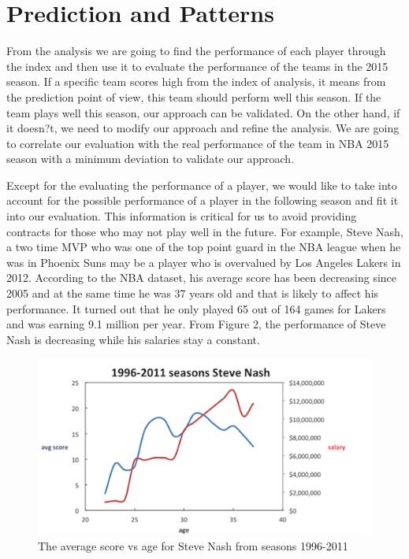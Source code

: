 \documentclass{acm_proc_article-sp}
\begin{document}
\section{Prediction and Patterns}
From the analysis we are going to find the performance of each player through the index and then use it to evaluate the performance of the teams in the 2015 season. If a specific team scores high from the index of analysis, it means from the prediction point of view, this team should perform well this season. If the team plays well this season, our approach can be validated. On the other hand, if it doesn?t, we need to modify our approach and refine the analysis. We are going to correlate our evaluation with the real performance of the team in NBA 2015 season with a minimum deviation to validate our approach.

Except for the evaluating the performance of a player, we would like to take into account for the possible performance of a player in the following season and fit it into our evaluation. This information is critical for us to avoid providing contracts for those who may not play well in the future. For example, Steve Nash, a two time MVP who was one of the top point guard in the NBA league when he was in Phoenix Suns may be a player who is overvalued by Los Angeles Lakers in 2012. According to the NBA dataset, his average score has been decreasing since 2005 and at the same time he was 37 years old and that is likely to affect his performance. It turned out that he only played 65 out of 164 games for Lakers and was earning 9.1 million per year. From Figure 2, the performance of Steve Nash is decreasing while his salaries stay a constant.

\begin{figure}[!htb]
\includegraphics{SN.png}
\caption{The average score vs age for Steve Nash from seasons 1996-2011}
\end{figure}
\end{document}
